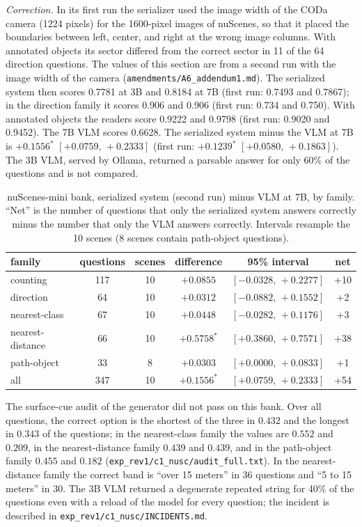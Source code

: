 \documentclass[10pt]{article}
\renewcommand{\thetable}{S\arabic{table}}
\newcommand{\settab}[1]{\setcounter{table}{#1}\addtocounter{table}{-1}\renewcommand{\thetable}{S\arabic{table}}}
\begin{document}
\emph{Correction.} In its first run the serializer used the image width of the CODa camera (1224 pixels) for the 1600-pixel images of nuScenes, so that it placed the boundaries between left, center, and right at the wrong image columns. With annotated objects its sector differed from the correct sector in 11 of the 64 direction questions. The values of this section are from a second run with the image width of the camera (\texttt{amendments/A6\_addendum1.md}). The serialized system then scores 0.7781 at 3B and 0.8184 at 7B (first run: 0.7493 and 0.7867); in the direction family it scores 0.906 and 0.906 (first run: 0.734 and 0.750). With annotated objects the readers score 0.9222 and 0.9798 (first run: 0.9020 and 0.9452). The 7B VLM scores 0.6628. The serialized system minus the VLM at 7B is $+0.1556^{*}$ $[+0.0759,\,+0.2333]$ (first run: $+0.1239^{*}$ $[+0.0580,\,+0.1863]$). The 3B VLM, served by Ollama, returned a parsable answer for only 60\% of the questions and is not compared.

\settab{9}\begin{table}[h]\centering\footnotesize
\caption{nuScenes-mini bank, serialized system (second run) minus VLM at 7B, by family. ``Net'' is the number of questions that only the serialized system answers correctly minus the number that only the VLM answers correctly. Intervals resample the 10 scenes (8 scenes contain path-object questions).}\label{tab:s9}
\begin{tabular}{@{}lccccc@{}}
\toprule family & questions & scenes & difference & 95\% interval & net \\ \midrule
counting & 117 & 10 & $+0.0855$ & $[-0.0328,\,+0.2277]$ & +10 \\
direction & 64 & 10 & $+0.0312$ & $[-0.0882,\,+0.1552]$ & +2 \\
nearest-class & 67 & 10 & $+0.0448$ & $[-0.0282,\,+0.1176]$ & +3 \\
nearest-distance & 66 & 10 & $+0.5758^{*}$ & $[+0.3860,\,+0.7571]$ & +38 \\
path-object & 33 & 8 & $+0.0303$ & $[+0.0000,\,+0.0833]$ & +1 \\
\midrule all & 347 & 10 & $+0.1556^{*}$ & $[+0.0759,\,+0.2333]$ & +54 \\
\bottomrule
\end{tabular}
\end{table}
The surface-cue audit of the generator did not pass on this bank. Over all questions, the correct option is the shortest of the three in $0.432$ and the longest in $0.343$ of the questions; in the nearest-class family the values are $0.552$ and $0.209$, in the nearest-distance family $0.439$ and $0.439$, and in the path-object family $0.455$ and $0.182$ (\texttt{exp\_rev1/c1\_nusc/audit\_full.txt}). In the nearest-distance family the correct band is ``over 15 meters'' in 36 questions and ``5 to 15 meters'' in 30. The 3B VLM returned a degenerate repeated string for 40\% of the questions even with a reload of the model for every question; the incident is described in \texttt{exp\_rev1/c1\_nusc/INCIDENTS.md}.
\end{document}
